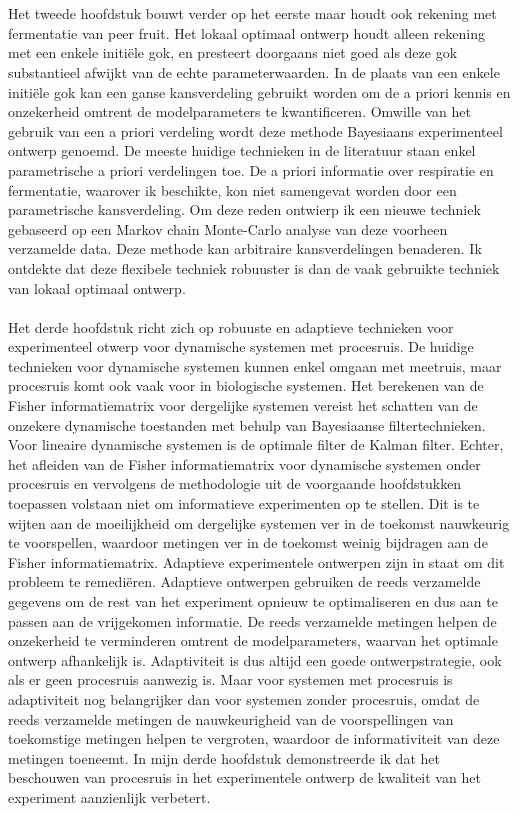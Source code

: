 \\
\\
Het tweede hoofdstuk bouwt verder op het eerste maar houdt ook rekening met fermentatie van peer fruit. Het lokaal optimaal ontwerp houdt alleen rekening met een enkele initiële gok, en presteert doorgaans niet goed als deze gok substantieel afwijkt van de echte parameterwaarden. In de plaats van een enkele initiële gok kan een ganse kansverdeling gebruikt worden om de a priori kennis en onzekerheid omtrent de modelparameters te kwantificeren. Omwille van het gebruik van een a priori verdeling wordt deze methode Bayesiaans experimenteel ontwerp genoemd. De meeste huidige technieken in de literatuur staan enkel parametrische a priori verdelingen toe. De a priori informatie over respiratie en fermentatie, waarover ik beschikte, kon niet samengevat worden door een parametrische kansverdeling. Om deze reden ontwierp ik een nieuwe techniek gebaseerd op een Markov chain Monte-Carlo analyse van deze voorheen verzamelde data. Deze methode kan arbitraire kansverdelingen benaderen. Ik ontdekte dat deze flexibele techniek robuuster is dan de vaak gebruikte techniek van lokaal optimaal ontwerp.
\\
\\
Het derde hoofdstuk richt zich op robuuste en adaptieve technieken voor experimenteel otwerp voor dynamische systemen met procesruis. De huidige technieken voor dynamische systemen kunnen enkel omgaan met meetruis, maar procesruis komt ook vaak voor in biologische systemen. Het berekenen van de Fisher informatiematrix voor dergelijke systemen vereist het schatten van de onzekere dynamische toestanden met behulp van Bayesiaanse filtertechnieken. Voor lineaire dynamische systemen is de optimale filter de Kalman filter. Echter, het afleiden van de Fisher informatiematrix voor dynamische systemen onder procesruis en vervolgens de methodologie uit de voorgaande hoofdstukken toepassen volstaan niet om informatieve experimenten op te stellen. Dit is te wijten aan de moeilijkheid om dergelijke systemen ver in de toekomst nauwkeurig te voorspellen, waardoor metingen ver in de toekomst weinig bijdragen aan de Fisher informatiematrix. Adaptieve experimentele ontwerpen zijn in staat om dit probleem te remediëren. Adaptieve ontwerpen gebruiken de reeds verzamelde gegevens om de rest van het experiment opnieuw te optimaliseren en dus aan te passen aan de vrijgekomen informatie. De reeds verzamelde metingen helpen de onzekerheid te verminderen omtrent de modelparameters, waarvan het optimale ontwerp afhankelijk is. Adaptiviteit is dus altijd een goede ontwerpstrategie, ook als er geen procesruis aanwezig is. Maar voor systemen met procesruis is adaptiviteit nog belangrijker dan voor systemen zonder procesruis, omdat de reeds verzamelde metingen de nauwkeurigheid van de voorspellingen van toekomstige metingen helpen te vergroten, waardoor de informativiteit van deze metingen toeneemt. In mijn derde hoofdstuk demonstreerde ik dat het beschouwen van procesruis in het experimentele ontwerp de kwaliteit van het experiment aanzienlijk verbetert.
